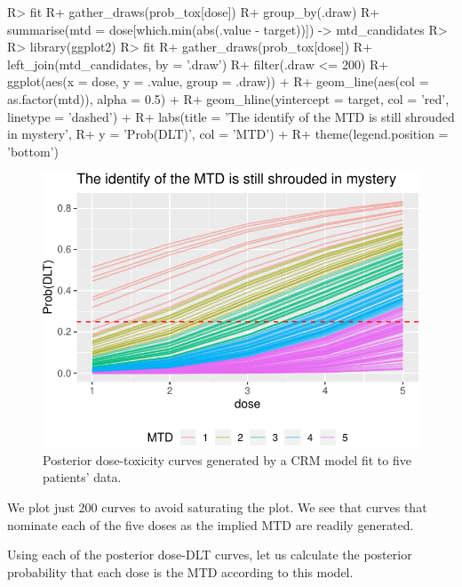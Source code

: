 \documentclass[article]{jss}
\begin{document}
\begin{CodeChunk}

\begin{CodeInput}
R> fit %
R+   gather_draws(prob_tox[dose]) %
R+   group_by(.draw) %
R+   summarise(mtd = dose[which.min(abs(.value - target))]) -> mtd_candidates
R> 
R> library(ggplot2)
R> fit %
R+   gather_draws(prob_tox[dose]) %
R+   left_join(mtd_candidates, by = '.draw') %
R+   filter(.draw <= 200) %
R+   ggplot(aes(x = dose, y = .value, group = .draw)) +
R+   geom_line(aes(col = as.factor(mtd)), alpha = 0.5) + 
R+   geom_hline(yintercept = target, col = 'red', linetype = 'dashed') + 
R+   labs(title = 'The identify of the MTD is still shrouded in mystery', 
R+        y = 'Prob(DLT)', col = 'MTD') +
R+   theme(legend.position = 'bottom')
\end{CodeInput}
\begin{figure}

{\centering \includegraphics{trialr_files/figure-latex/unnamed-chunk-3-1} 

}

\caption[Posterior dose-toxicity curves generated by a CRM model fit to five patients' data]{Posterior dose-toxicity curves generated by a CRM model fit to five patients' data.}\label{fig:unnamed-chunk-3}
\end{figure}
\end{CodeChunk}

We plot just 200 curves to avoid saturating the plot. We see that curves
that nominate each of the five doses as the implied MTD are readily
generated.

Using each of the posterior dose-DLT curves, let us calculate the
posterior probability that each dose is the MTD according to this model.
\end{document}
